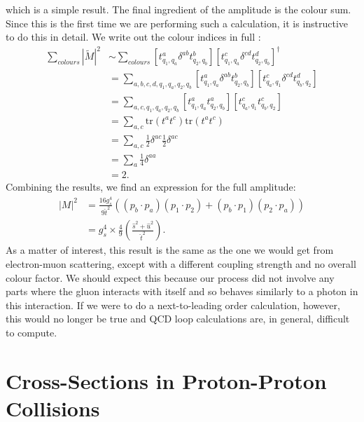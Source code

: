which is a simple result. The final ingredient of the amplitude is the colour sum. Since this is the first time we are performing such a calculation, it is instructive to do this in detail. We write out the colour indices in full \cite{Skands2011}:
\begin{equation}
\begin{split}
\sum_{colours} |\tilde{M}|^2 & \sim \sum_{colours} [t^a_{q_1, q_a} \delta^{ab} t^b_{q_2, q_b}] [t^c_{q_1,q_a} \delta^{cd} t^d_{q_2, q_b}]^\dagger \\
&= \sum_{a,b,c,d,q_1,q_a,q_2,q_b} [t^a_{q_1, q_a} \delta^{ab} t^b_{q_2, q_b}] [t^c_{q_a,q_1} \delta^{cd} t^d_{q_b, q_2}] \\
&= \sum_{a,c,q_1,q_a,q_2,q_b} [t^a_{q_1, q_a} t^a_{q_2, q_b}] [t^c_{q_a,q_1} t^c_{q_b, q_2}] \\
&= \sum_{a,c} \text{tr}(t^a t^c) \text{tr}(t^a t^c) \\
&= \sum_{a,c} \frac{1}{2} \delta^{ac} \frac{1}{2} \delta^{ac} \\
&= \sum_a \frac{1}{4} \delta^{aa} \\
&= 2.
\end{split}
\end{equation}
Combining the results, we find an expression for the full amplitude:
\begin{equation}
\begin{split}
|M|^2 &= \frac{16 g_s^4}{9 \hat{t}^2} \left((p_b \cdot p_a)(p_1 \cdot p_2) + (p_b \cdot p_1)(p_2 \cdot p_a) \right) \\
&= g_s^4 \times \frac{4}{9} \left(\frac{\hat{s}^2 + \hat{u}^2}{\hat{t}^2} \right).
\end{split}
\label{eqn:qQ_qQ_LO}
\end{equation}
As a matter of interest, this result is the same as the one we would get from electron-muon scattering, except with a different coupling strength and no overall colour factor. We should expect this because our process did not involve any parts where the gluon interacts with itself and so behaves similarly to a photon in this interaction. If we were to do a next-to-leading order calculation, however, this would no longer be true and QCD loop calculations are, in general, difficult to compute.

\section{Cross-Sections in Proton-Proton Collisions}

